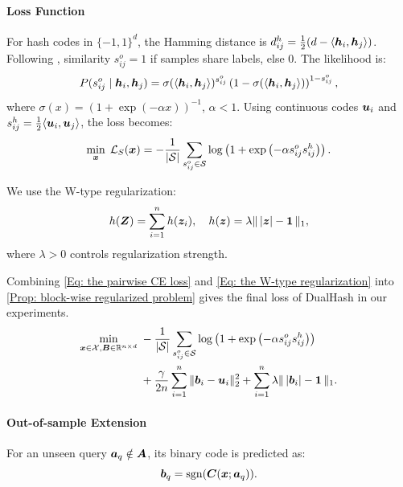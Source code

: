 \paragraph{Loss Function}  
For hash codes in $\{-1,1\}^d$, the Hamming distance is $d_{ij}^h = \tfrac{1}{2}(d - \langle \bm{h}_i, \bm{h}_j \rangle)$. Following \cite{xiaSupervisedHashingImage2014,laiSimultaneousFeatureLearning2015}, similarity $s^o_{ij} = 1$ if samples share labels, else $0$. The likelihood is:
\[
P(s^o_{ij} \mid \bm{h}_i, \bm{h}_j) = \sigma(\langle \bm{h}_i, \bm{h}_j \rangle)^{s^o_{ij}} \left(1 - \sigma(\langle \bm{h}_i, \bm{h}_j \rangle)\right)^{1 - s^o_{ij}},
\]
where $\sigma(x) = (1 + \exp(-\alpha x))^{-1}$, $\alpha < 1$. Using continuous codes $\bm{u}_i$ and $s^h_{ij} = \tfrac{1}{2} \langle \bm{u}_i, \bm{u}_j \rangle$, the loss becomes:
\begin{align}
\label{Eq: the pairwise CE loss}
\min_{\bm{x}} \; \mathcal{L}_S(\bm{x}) = -\frac{1}{|\mathcal{S}|} \sum_{s^o_{ij} \in \mathcal{S}} \log\left(1 + \exp\left(-\alpha s^o_{ij} s^h_{ij}\right)\right).
\end{align}

We use the W-type regularization:
\begin{align}
\label{Eq: the W-type regularization}
h(\bm{Z}) = \sum_{i=1}^n h(\bm{z}_i), \quad h(\bm{z}) = \lambda \|\,|\bm{z}| - \bm{1}\,\|_1,
\end{align}
where $\lambda > 0$ controls regularization strength.

Combining \eqref{Eq: the pairwise CE loss} and \eqref{Eq: the W-type regularization} into \eqref{Prop: block-wise regularized problem} gives the final loss of DualHash in our experiments.
\begin{align}
\min_{\bm{x} \in \mathcal{X}, \bm{B} \in \mathbb{R}^{n\times d}} \; 
&-\frac{1}{|\mathcal{S}|} \sum_{s^o_{ij} \in \mathcal{S}} \log\left(1 + \exp\left(-\alpha s^o_{ij} s^h_{ij}\right)\right) \notag \\
&+ \frac{\gamma}{2n}\sum_{i=1}^n \| \bm{b}_i - \bm{u}_i\|_2^2 
+ \sum_{i=1}^n \lambda \|\,|\bm{b}_i| - \bm{1}\,\|_1. \notag
\end{align}


\paragraph{Out-of-sample Extension}  
For an unseen query $\bm{a}_q \notin \bm{A}$, its binary code is predicted as:
\[
\bm{b}_q = \operatorname{sgn}(\bm{C}(\bm{x}; \bm{a}_q)).
\]

